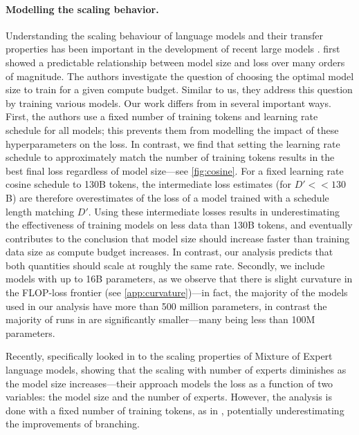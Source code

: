 \paragraph{Modelling the scaling behavior.} Understanding the scaling behaviour of language models and their transfer properties has been important in the development of recent large models \citep{kaplan2020scaling,  hernandez2021scaling}. 
\citet{kaplan2020scaling} first showed a predictable relationship between model size and loss over many orders of magnitude. The authors investigate the question of choosing the optimal model size to train for a given compute budget. Similar to us, they address this question by training various models. Our work differs from \citet{kaplan2020scaling} in several important ways. First, the authors use a fixed number of training tokens and learning rate schedule for all models; this prevents them from modelling the impact of these hyperparameters on the loss. In contrast, we find that setting the learning rate schedule to approximately match the number of training tokens results in the best final loss regardless of model size---see \autoref{fig:cosine}.
For a fixed learning rate cosine schedule to 130B tokens, the intermediate loss estimates (for $D' << 130$B) are therefore overestimates of the loss of a model trained with a schedule length matching $D'$. Using these intermediate losses results in underestimating the effectiveness of training models on less data than 130B tokens, and eventually contributes to the conclusion that model size should increase faster than training data size as compute budget increases. In contrast, our analysis predicts that both quantities should scale at roughly the same rate. Secondly, we include models with up to 16B parameters, as we observe that there is slight curvature in the FLOP-loss frontier (see \autoref{app:curvature})---in fact, the majority of the models used in our analysis have more than 500 million parameters, in contrast the majority of runs in \citet{kaplan2020scaling} are significantly smaller---many being less than 100M parameters.

Recently, \citet{clark2022unified} specifically looked in to the scaling properties of Mixture of Expert language models, showing that the scaling with number of experts diminishes as the model size increases---their approach models the loss as a function of two variables: the model size and the number of experts. However, the analysis is done with a fixed number of training tokens, as in \citet{kaplan2020scaling}, potentially underestimating the improvements of branching.

